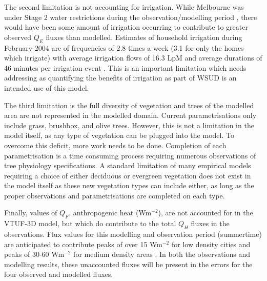 \documentclass[final,3p,times,authoryear]{elsarticle}
\begin{document}

The second limitation is not accounting for irrigation. While Melbourne was under Stage 2 water restrictions during the observation/modelling period \citep{MelbourneWater2016a}, there would have been some amount of irrigation occurring to contribute to greater observed $Q_{E}$ fluxes than modelled. Estimates of household irrigation during February 2004 are of frequencies of 2.8 times a week (3.1 for only the homes which irrigate) with average irrigation flows of 16.3 LpM and average durations of 46 minutes per irrigation event \citep{Roberts2005}. This is an important limitation which needs addressing as quantifying the benefits of irrigation as part of WSUD is an intended use of this model.

The third limitation is the full diversity of vegetation and trees of the modelled area are not represented in the modelled domain. Current parametrisations only include grass, brushbox, and olive trees. However, this is not a limitation in the model itself, as any type of vegetation can be plugged into the model. To overcome this deficit, more work needs to be done. Completion of each parametrisation is a time consuming process requiring numerous observations of tree physiology specifications. A standard limitation of many empirical models requiring a choice of either deciduous or evergreen vegetation does not exist in the model itself as these new vegetation types can include either, as long as the proper observations and parametrisations are completed on each type.


Finally, values of $Q_{F}$, anthropogenic heat (Wm$^{-2}$), are not accounted for in the VTUF-3D model, but which do contribute to the total $Q_{H}$ fluxes in the observations. Flux values for this modelling and observation period (summertime) are anticipated to contribute peaks of over 15 Wm$^{-2}$ for low density cities and peaks of 30-60 Wm$^{-2}$ for medium density areas \citep{Sailor2004}. In both the observations and modelling results, these unaccounted fluxes will be present in the errors for the four observed and modelled fluxes.
\end{document}
